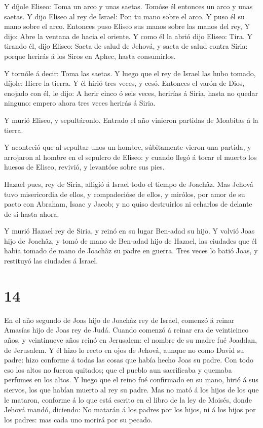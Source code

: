  Y díjole Eliseo: Toma un arco y unas saetas. Tomóse él
entonces un arco y unas saetas.  Y dijo Eliseo al rey de
Israel: Pon tu mano sobre el arco. Y puso él su mano sobre el arco.
Entonces puso Eliseo sus manos sobre las manos del rey,  Y
dijo: Abre la ventana de hacia el oriente. Y como él la abrió dijo
Eliseo: Tira. Y tirando él, dijo Eliseo: Saeta de salud de Jehová, y
saeta de salud contra Siria: porque herirás á los Siros en Aphec, hasta
consumirlos.

 Y tornóle á decir: Toma las saetas. Y luego que el rey de
Israel las hubo tomado, díjole: Hiere la tierra. Y él hirió tres veces,
y cesó.  Entonces el varón de Dios, enojado con él, le
dijo: A herir cinco ó seis veces, herirías á Siria, hasta no quedar
ninguno: empero ahora tres veces herirás á Siria.

 Y murió Eliseo, y sepultáronlo. Entrado el año vinieron
partidas de Moabitas á la tierra.

 Y aconteció que al sepultar unos un hombre, súbitamente
vieron una partida, y arrojaron al hombre en el sepulcro de Eliseo: y
cuando llegó á tocar el muerto los huesos de Eliseo, revivió, y
levantóse sobre sus pies.

 Hazael pues, rey de Siria, afligió á Israel todo el tiempo
de Joachâz.  Mas Jehová tuvo misericordia de ellos, y
compadecióse de ellos, y mirólos, por amor de su pacto con Abraham,
Isaac y Jacob; y no quiso destruirlos ni echarlos de delante de sí hasta
ahora.

 Y murió Hazael rey de Siria, y reinó en su lugar Ben-adad
su hijo.  Y volvió Joas hijo de Joachâz, y tomó de mano de
Ben-adad hijo de Hazael, las ciudades que él había tomado de mano de
Joachâz su padre en guerra. Tres veces lo batió Joas, y restituyó las
ciudades á Israel.

\hypertarget{section-13}{%
\section{14}\label{section-13}}

 En el año segundo de Joas hijo de Joachâz rey de Israel,
comenzó á reinar Amasías hijo de Joas rey de Judá.  Cuando
comenzó á reinar era de veinticinco años, y veintinueve años reinó en
Jerusalem: el nombre de su madre fué Joaddan, de Jerusalem. 
Y él hizo lo recto en ojos de Jehová, aunque no como David su padre:
hizo conforme á todas las cosas que había hecho Joas su padre.
 Con todo eso los altos no fueron quitados; que el pueblo
aun sacrificaba y quemaba perfumes en los altos.  Y luego
que el reino fué confirmado en su mano, hirió á sus siervos, los que
habían muerto al rey su padre.  Mas no mató á los hijos de
los que le mataron, conforme á lo que está escrito en el libro de la ley
de Moisés, donde Jehová mandó, diciendo: No matarán á los padres por los
hijos, ni á los hijos por los padres: mas cada uno morirá por su pecado.

